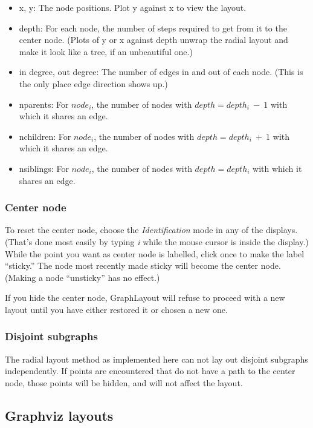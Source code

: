 \documentclass[11pt]{article}
\begin{document}
\begin{itemize}
\item x, y: The node positions.  Plot y against x to view the layout.
\item depth: For each node, the number of steps required to get from it
  to the center node. (Plots of y or x against depth unwrap the
  radial layout and make it look like a tree, if an unbeautiful one.)
\item in degree, out degree:  The number of edges in and out of each
  node. (This is the only place edge direction shows up.)
\item nparents: For $node_i$, the number of nodes with $depth = depth_i~-~1$
  with which it shares an edge. 
\item nchildren: For $node_i$, the number of nodes with $depth = depth_i~+~1$
  with which it shares an edge.
\item nsiblings: For $node_i$, the number of nodes with $depth = depth_i$
  with which it shares an edge.
\end{itemize}

\subsubsection{Center node}

To reset the center node, choose the {\em Identification} mode in
any of the displays.  (That's done most easily by typing {\em i} while
the mouse cursor is inside the display.)  While the point you want
as center node is labelled, click once to make the label ``sticky.''
The node most recently made sticky will become the center node.
(Making a node ``unsticky'' has no effect.)

If you hide the center node, GraphLayout will refuse to proceed with
a new layout until you have either restored it or chosen a new one.

\subsubsection{Disjoint subgraphs}

The radial layout method as implemented here can not lay out
disjoint subgraphs independently.  If points are encountered that
do not have a path to the center node, those points will be hidden,
and will not affect the layout.

\subsection {Graphviz layouts}
\end{document}
